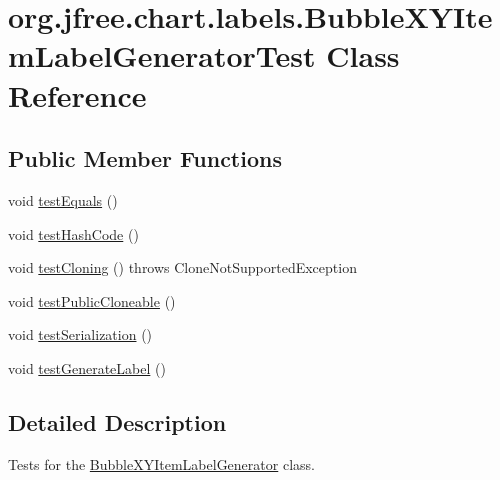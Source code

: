 \hypertarget{classorg_1_1jfree_1_1chart_1_1labels_1_1_bubble_x_y_item_label_generator_test}{}\section{org.\+jfree.\+chart.\+labels.\+Bubble\+X\+Y\+Item\+Label\+Generator\+Test Class Reference}
\label{classorg_1_1jfree_1_1chart_1_1labels_1_1_bubble_x_y_item_label_generator_test}
\subsection*{Public Member Functions}
\begin{DoxyCompactItemize}
\item 
void \mbox{\hyperlink{classorg_1_1jfree_1_1chart_1_1labels_1_1_bubble_x_y_item_label_generator_test_a7ba3f0c0a6dcea4ebfc0c2d38c11de5a}{test\+Equals}} ()
\item 
void \mbox{\hyperlink{classorg_1_1jfree_1_1chart_1_1labels_1_1_bubble_x_y_item_label_generator_test_aa31798c86740fa0b8ba743eec501841c}{test\+Hash\+Code}} ()
\item 
void \mbox{\hyperlink{classorg_1_1jfree_1_1chart_1_1labels_1_1_bubble_x_y_item_label_generator_test_aa80bc028a6c091633954fd2fbab711f6}{test\+Cloning}} ()  throws Clone\+Not\+Supported\+Exception 
\item 
void \mbox{\hyperlink{classorg_1_1jfree_1_1chart_1_1labels_1_1_bubble_x_y_item_label_generator_test_a12cd5745fcae7ef2f434521663d520cb}{test\+Public\+Cloneable}} ()
\item 
void \mbox{\hyperlink{classorg_1_1jfree_1_1chart_1_1labels_1_1_bubble_x_y_item_label_generator_test_a0b09a43668f701fd112a75bafabbe0c3}{test\+Serialization}} ()
\item 
void \mbox{\hyperlink{classorg_1_1jfree_1_1chart_1_1labels_1_1_bubble_x_y_item_label_generator_test_ab86334d420c84b1be44206375cc8e82e}{test\+Generate\+Label}} ()
\end{DoxyCompactItemize}


\subsection{Detailed Description}
Tests for the \mbox{\hyperlink{classorg_1_1jfree_1_1chart_1_1labels_1_1_bubble_x_y_item_label_generator}{Bubble\+X\+Y\+Item\+Label\+Generator}} class. 

